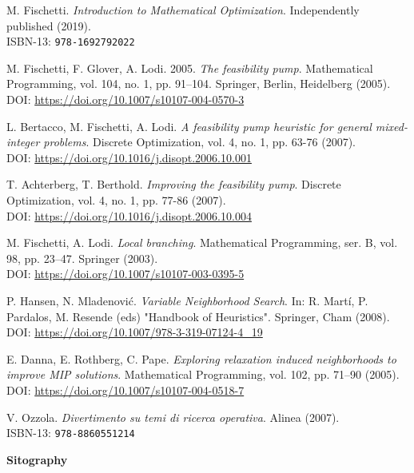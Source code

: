 \documentclass[a4paper,12pt,twoside]{scrbook}
\begin{document}
\begin{thebibliography}{9}
	 M. Fischetti. \textit{Introduction to Mathematical Optimization}. Independently published (2019). \\ ISBN-13: \texttt{978-1692792022}

	 M. Fischetti, F. Glover, A. Lodi. 2005. \textit{The feasibility pump}. Mathematical Programming, vol. 104, no. 1, pp. 91–104. Springer, Berlin, Heidelberg (2005). \\ DOI: \url{https://doi.org/10.1007/s10107-004-0570-3}

	 L. Bertacco, M. Fischetti, A. Lodi. \textit{A feasibility pump heuristic for general mixed-integer problems}. Discrete Optimization, vol. 4, no. 1, pp. 63-76 (2007). \\ DOI: \url{https://doi.org/10.1016/j.disopt.2006.10.001}

	 T. Achterberg, T. Berthold. \textit{Improving the feasibility pump}. Discrete Optimization, vol. 4, no. 1, pp. 77-86 (2007). \\ DOI: \url{https://doi.org/10.1016/j.disopt.2006.10.004}

	 M. Fischetti, A. Lodi. \textit{Local branching}. Mathematical Programming, ser. B, vol. 98, pp. 23–47. Springer (2003). \\ DOI: \url{https://doi.org/10.1007/s10107-003-0395-5}

	 P. Hansen, N. Mladenović. \textit{Variable Neighborhood Search}. In: R. Martí, P. Pardalos, M. Resende (eds) "Handbook of Heuristics". Springer, Cham (2008). \\ DOI: \url{https://doi.org/10.1007/978-3-319-07124-4_19}

	 E. Danna, E. Rothberg, C. Pape. \textit{Exploring relaxation induced neighborhoods to improve MIP solutions}. Mathematical Programming, vol. 102, pp. 71–90 (2005). \\ DOI: \url{https://doi.org/10.1007/s10107-004-0518-7}
	
	 V. Ozzola. \textit{Divertimento su temi di ricerca operativa}. Alinea (2007). \\ ISBN-13: \texttt{978-8860551214}

	\vspace{0.5cm}
	\textsf{\Large \textbf{Sitography}}


\end{thebibliography}
\end{document}
